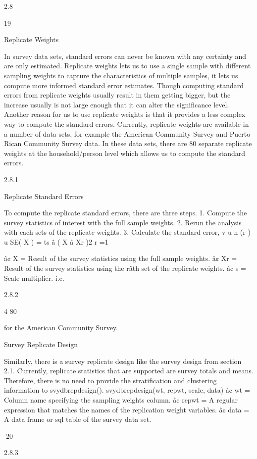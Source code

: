 2.8

19

Replicate Weights

In survey data sets, standard errors can never be known with any certainty and are
only estimated. Replicate weights lets us to use a single sample with different sampling weights to capture the characteristics of multiple samples, it lets us compute
more informed standard error estimates. Though computing standard errors from
replicate weights usually result in them getting bigger, but the increase usually is
not large enough that it can alter the significance level.
Another reason for us to use replicate weights is that it provides a less complex
way to compute the standard errors.
Currently, replicate weights are available in a number of data sets, for example
the American Community Survey and Puerto Rican Community Survey data. In
these data sets, there are 80 separate replicate weights at the household/person level
which allows us to compute the standard errors.

2.8.1

Replicate Standard Errors

To compute the replicate standard errors, there are three steps.
1. Compute the survey statistics of interest with the full sample weights.
2. Rerun the analysis with each sets of the replicate weights.
3. Calculate the standard error,
v
u n (r )
u
SE( X ) = ts â ( X â Xr )2
r =1

â¢ X = Result of the survey statistics using the full sample weights.
â¢ Xr = Result of the survey statistics using the râth set of the replicate weights.
â¢ s = Scale multiplier. i.e.

2.8.2

4
80

for the American Community Survey.

Survey Replicate Design

Similarly, there is a survey replicate design like the survey design from section 2.1.
Currently, replicate statistics that are supported are survey totals and means.
Therefore, there is no need to provide the stratification and clustering information
to svydbrepdesign().
svydbrepdesign(wt, repwt, scale, data)
â¢ wt = Column name specifying the sampling weights column.
â¢ repwt = A regular expression that matches the names of the replication weight
variables.
â¢ data = A data frame or sql table of the survey data set.

20

2.8.3

